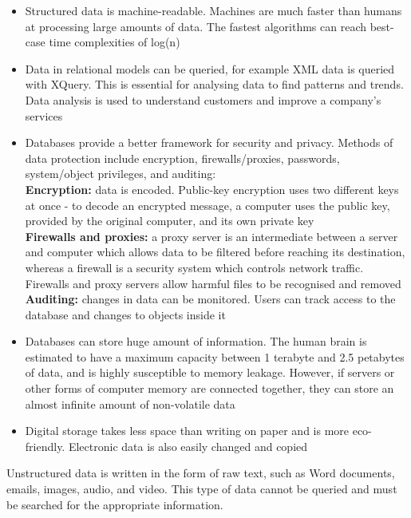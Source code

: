 \documentclass[12pt]{article}
\begin{document}
\begin{itemize}
\item 
Structured data is machine-readable. Machines are much faster than humans at processing large amounts of data. The fastest algorithms can reach best-case time complexities of log(n)
\item 
Data in relational models can be queried, for example XML data is queried with XQuery. This is essential for analysing data to find patterns and trends. Data analysis is used to understand customers and improve a company's services
\item
Databases provide a better framework for security and privacy. Methods of data protection include encryption, firewalls/proxies, passwords, system/object privileges, and auditing: \\
\textbf{Encryption:} data is encoded. Public-key encryption uses two different keys at once - to decode an encrypted message, a computer uses the public key, provided by the original computer, and its own private key \\
\textbf{Firewalls and proxies:} a proxy server is an intermediate between a server and computer which allows data to be filtered before reaching its destination, whereas a firewall is a security system which controls network traffic. Firewalls and proxy servers allow harmful files to be recognised and removed \\
\textbf{Auditing:} changes in data can be monitored. Users can track access to the database and changes to objects inside it
\item 
Databases can store huge amount of information. The human brain is estimated to have a maximum capacity between 1 terabyte and 2.5 petabytes of data, and is highly susceptible to memory leakage. However, if servers or other forms of computer memory are connected together, they can store an almost infinite amount of non-volatile data
\item 
Digital storage takes less space than writing on paper and is more eco-friendly. Electronic data is also easily changed and copied 
\end{itemize}

Unstructured data is written in the form of raw text, such as Word documents, emails, images, audio, and video. This type of data cannot be queried and must be searched for the appropriate information. 
\end{document}
